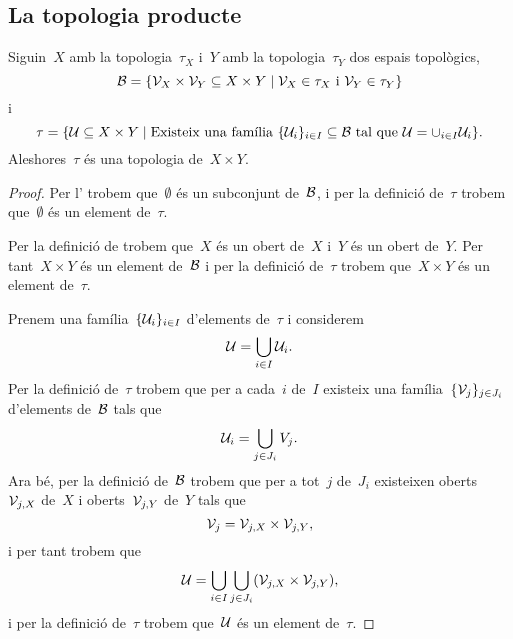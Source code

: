 \documentclass[../../main.tex]{subfiles}
\begin{document}
    \subsection{La topologia producte}
    \begin{proposition}
        \label{prop:la topologia producte}
        Siguin~\(X\) amb la topologia~\(\tau_{X}\) i~\(Y\) amb la topologia~\(\tau_{Y}\) dos espais topològics,
        \[
            \mathcal{B}=\{\mathcal{V}_{X}\times\mathcal{V}_{Y}\subseteq X\times Y\mid\mathcal{V}_{X}\in\tau_{X}\text{ i }\mathcal{V}_{Y}\in\tau_{Y}\}
        \]
        i
        \[
            \tau=\{\mathcal{U}\subseteq X\times Y\mid\text{Existeix una família }\{\mathcal{U}_{i}\}_{i\in I}\subseteq\mathcal{B}\text{ tal que }\mathcal{U}=\cup_{i\in I}\mathcal{U}_{i}\}.
        \]
        Aleshores~\(\tau\) és una topologia de~\(X\times Y\).
        \begin{proof}
            Per l' trobem que~\(\emptyset\) és un subconjunt de~\(\mathcal{B}\), i per la definició de~\(\tau\) trobem que~\(\emptyset\) és un element de~\(\tau\).

            Per la definició de  trobem que~\(X\) és un obert de~\(X\) i~\(Y\) és un obert de~\(Y\).
            Per tant~\(X\times Y\) és un element de~\(\mathcal{B}\) i per la definició de~\(\tau\) trobem que~\(X\times Y\) és un element de~\(\tau\).

            Prenem una família~\(\{\mathcal{U}_{i}\}_{i\in I}\) d'elements de~\(\tau\) i considerem
            \[
                \mathcal{U}=\bigcup_{i\in I}\mathcal{U}_{i}.
            \]
            Per la definició de~\(\tau\) trobem que per a cada~\(i\) de~\(I\) existeix una família~\(\{\mathcal{V}_{j}\}_{j\in J_{i}}\) d'elements de~\(\mathcal{B}\) tals que
            \[
                \mathcal{U}_{i}=\bigcup_{j\in J_{i}}V_{j}.
            \]
            Ara bé, per la definició de~\(\mathcal{B}\) trobem que per a tot~\(j\) de~\(J_{i}\) existeixen oberts~\(\mathcal{V}_{j,X}\) de~\(X\) i oberts~\(\mathcal{V}_{j,Y}\) de~\(Y\) tals que
            \[
                \mathcal{V}_{j}=\mathcal{V}_{j,X}\times\mathcal{V}_{j,Y},
            \]
            i per tant trobem que
            \[
                \obert{U}=\bigcup_{i\in I}\bigcup_{j\in J_{i}}\left(\obert{V}_{j,X}\times\obert{V}_{j,Y}\right),
            \]
            i per la definició de~\(\tau\) trobem que~\(\mathcal{U}\) és un element de~\(\tau\).


\end{proof}
\end{proposition}
\end{document}
